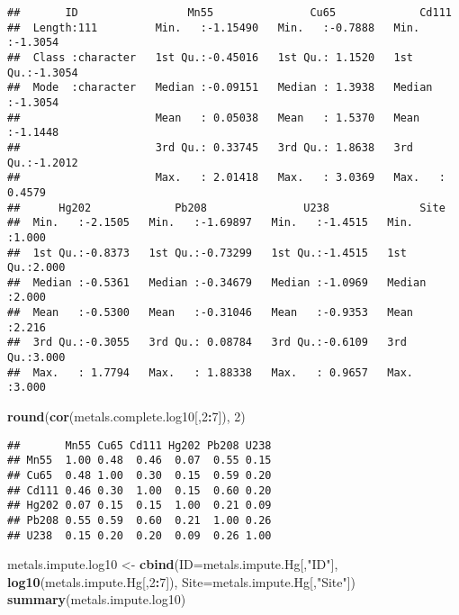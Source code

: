 \documentclass[]{article}
\newenvironment{Shaded}{\begin{snugshade}}{\end{snugshade}}
\newcommand{\DataTypeTok}[1]{\textcolor[rgb]{0.13,0.29,0.53}{#1}}
\newcommand{\DecValTok}[1]{\textcolor[rgb]{0.00,0.00,0.81}{#1}}
\newcommand{\KeywordTok}[1]{\textcolor[rgb]{0.13,0.29,0.53}{\textbf{#1}}}
\newcommand{\NormalTok}[1]{#1}
\newcommand{\OperatorTok}[1]{\textcolor[rgb]{0.81,0.36,0.00}{\textbf{#1}}}
\newcommand{\StringTok}[1]{\textcolor[rgb]{0.31,0.60,0.02}{#1}}
\begin{document}
\begin{verbatim}
##       ID                 Mn55               Cu65             Cd111        
##  Length:111         Min.   :-1.15490   Min.   :-0.7888   Min.   :-1.3054  
##  Class :character   1st Qu.:-0.45016   1st Qu.: 1.1520   1st Qu.:-1.3054  
##  Mode  :character   Median :-0.09151   Median : 1.3938   Median :-1.3054  
##                     Mean   : 0.05038   Mean   : 1.5370   Mean   :-1.1448  
##                     3rd Qu.: 0.33745   3rd Qu.: 1.8638   3rd Qu.:-1.2012  
##                     Max.   : 2.01418   Max.   : 3.0369   Max.   : 0.4579  
##      Hg202             Pb208               U238              Site      
##  Min.   :-2.1505   Min.   :-1.69897   Min.   :-1.4515   Min.   :1.000  
##  1st Qu.:-0.8373   1st Qu.:-0.73299   1st Qu.:-1.4515   1st Qu.:2.000  
##  Median :-0.5361   Median :-0.34679   Median :-1.0969   Median :2.000  
##  Mean   :-0.5300   Mean   :-0.31046   Mean   :-0.9353   Mean   :2.216  
##  3rd Qu.:-0.3055   3rd Qu.: 0.08784   3rd Qu.:-0.6109   3rd Qu.:3.000  
##  Max.   : 1.7794   Max.   : 1.88338   Max.   : 0.9657   Max.   :3.000
\end{verbatim}

\begin{Shaded}
\begin{Highlighting}[]
\KeywordTok{round}\NormalTok{(}\KeywordTok{cor}\NormalTok{(metals.complete.log10[,}\DecValTok{2}\OperatorTok{:}\DecValTok{7}\NormalTok{]), }\DecValTok{2}\NormalTok{)}
\end{Highlighting}
\end{Shaded}

\begin{verbatim}
##       Mn55 Cu65 Cd111 Hg202 Pb208 U238
## Mn55  1.00 0.48  0.46  0.07  0.55 0.15
## Cu65  0.48 1.00  0.30  0.15  0.59 0.20
## Cd111 0.46 0.30  1.00  0.15  0.60 0.20
## Hg202 0.07 0.15  0.15  1.00  0.21 0.09
## Pb208 0.55 0.59  0.60  0.21  1.00 0.26
## U238  0.15 0.20  0.20  0.09  0.26 1.00
\end{verbatim}

\begin{Shaded}
\begin{Highlighting}[]
\NormalTok{metals.impute.log10 <-}\StringTok{ }\KeywordTok{cbind}\NormalTok{(}\DataTypeTok{ID=}\NormalTok{metals.impute.Hg[,}\StringTok{"ID"}\NormalTok{],}
                               \KeywordTok{log10}\NormalTok{(metals.impute.Hg[,}\DecValTok{2}\OperatorTok{:}\DecValTok{7}\NormalTok{]),}
                               \DataTypeTok{Site=}\NormalTok{metals.impute.Hg[,}\StringTok{"Site"}\NormalTok{])}
\KeywordTok{summary}\NormalTok{(metals.impute.log10)}
\end{Highlighting}
\end{Shaded}
\end{document}

